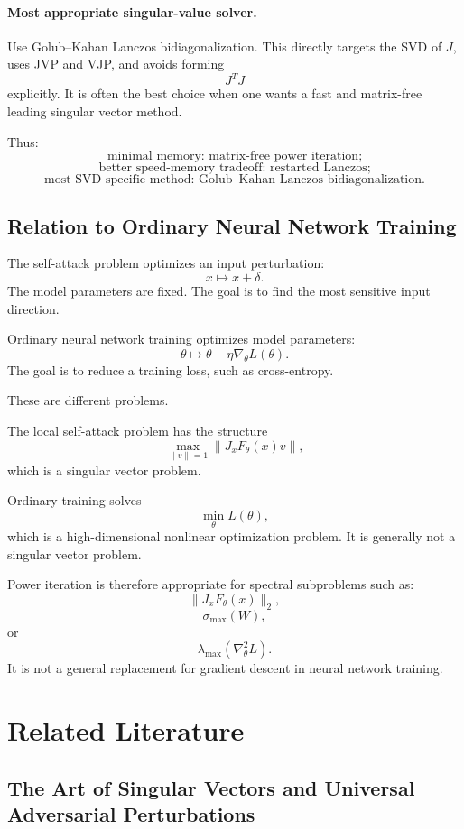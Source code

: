 \documentclass{article}
\begin{document}
\paragraph{Most appropriate singular-value solver.}
Use Golub--Kahan Lanczos bidiagonalization. This directly targets the SVD of \(J\), uses JVP and VJP, and avoids forming
\[
J^TJ
\]
explicitly. It is often the best choice when one wants a fast and matrix-free leading singular vector method.

Thus:
\[
\boxed{
\text{minimal memory: matrix-free power iteration;}
}
\]
\[
\boxed{
\text{better speed-memory tradeoff: restarted Lanczos;}
}
\]
\[
\boxed{
\text{most SVD-specific method: Golub--Kahan Lanczos bidiagonalization.}
}
\]

\subsection{Relation to Ordinary Neural Network Training}

The self-attack problem optimizes an input perturbation:
\[
x\mapsto x+\delta.
\]
The model parameters are fixed. The goal is to find the most sensitive input direction.

Ordinary neural network training optimizes model parameters:
\[
\theta\mapsto \theta-\eta\nabla_\theta L(\theta).
\]
The goal is to reduce a training loss, such as cross-entropy.

These are different problems.

The local self-attack problem has the structure
\[
\max_{\|v\|=1}\|J_xF_\theta(x)v\|,
\]
which is a singular vector problem.

Ordinary training solves
\[
\min_\theta L(\theta),
\]
which is a high-dimensional nonlinear optimization problem. It is generally not a singular vector problem.

Power iteration is therefore appropriate for spectral subproblems such as:
\[
\|J_xF_\theta(x)\|_2,
\]
\[
\sigma_{\max}(W),
\]
or
\[
\lambda_{\max}(\nabla_\theta^2 L).
\]
It is not a general replacement for gradient descent in neural network training.

\section{Related Literature}

\subsection{The Art of Singular Vectors and Universal Adversarial Perturbations}
\end{document}
